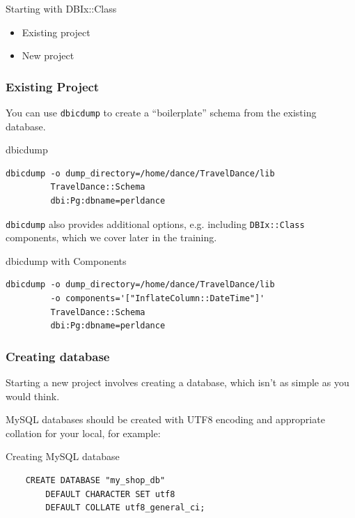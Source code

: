 \begin{frame}{Starting with DBIx::Class}
\begin{itemize}
\item Existing project
\item New project
\end{itemize}
\end{frame}

\subsubsection{Existing Project}

You can use \verb|dbicdump| to create a ``boilerplate'' schema from the
existing database.

\begin{frame}[fragile]{dbicdump}
\begin{lstlisting}
dbicdump -o dump_directory=/home/dance/TravelDance/lib 
         TravelDance::Schema 
         dbi:Pg:dbname=perldance
\end{lstlisting}
\end{frame}

\verb|dbicdump| also provides additional options, e.g.
including \verb|DBIx::Class| components, which we cover
later in the training.

\begin{frame}[fragile]{dbicdump with Components}
\begin{lstlisting}
dbicdump -o dump_directory=/home/dance/TravelDance/lib 
         -o components='["InflateColumn::DateTime"]'
         TravelDance::Schema 
         dbi:Pg:dbname=perldance
\end{lstlisting}
\end{frame}

\subsubsection{Creating database}
Starting a new project involves creating a database, which
isn't as simple as you would think.

MySQL databases should be created with UTF8 encoding and appropriate 
collation for your local, for example:

\begin{frame}[fragile]{Creating MySQL database}
\begin{lstlisting}
    CREATE DATABASE "my_shop_db"
        DEFAULT CHARACTER SET utf8
        DEFAULT COLLATE utf8_general_ci;
\end{lstlisting}
\end{frame}

